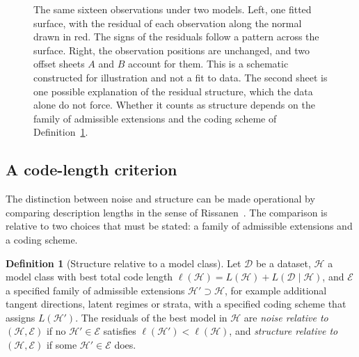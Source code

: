 \documentclass[11pt,a4paper]{article}
\theoremstyle{definition}
\newtheorem{definition}[theorem]{Definition}
\theoremstyle{remark}
\begin{document}
\begin{figure}[ht]
\begin{minipage}[c]{0.49\linewidth}
\end{minipage}
\caption{The same sixteen observations under two models. Left, one fitted
surface, with the residual of each observation along the normal drawn in red.
The signs of the residuals follow a pattern across the surface. Right, the
observation positions are unchanged, and two offset sheets $A$ and $B$ account
for them. This is a schematic constructed for illustration and not a
fit to data. The second sheet is one possible explanation of the residual
structure, which the data alone do not force. Whether it counts as structure
depends on the family of admissible extensions and the coding scheme of
Definition~\ref{def:structure}.}
\label{fig:resolves}
\end{figure}

\subsection{A code-length criterion}

The distinction between noise and structure can be made operational by
comparing description lengths in the sense of Rissanen~\cite{rissanen1978modeling}.
The comparison is relative to two choices that must be stated: a family of
admissible extensions and a coding scheme.

\begin{definition}[Structure relative to a model class]\label{def:structure}
Let $\mathcal{D}$ be a dataset, $\mathcal{H}$ a model class with best total
code length $\ell(\mathcal{H})=L(\mathcal{H})+L(\mathcal{D}\mid\mathcal{H})$,
and $\mathcal{E}$ a specified family of admissible extensions
$\mathcal{H}'\supset\mathcal{H}$, for example additional tangent directions,
latent regimes or strata, with a specified coding scheme that assigns
$L(\mathcal{H}')$. The residuals of the best model in $\mathcal{H}$ are
\emph{noise relative to $(\mathcal{H},\mathcal{E})$} if no
$\mathcal{H}'\in\mathcal{E}$ satisfies $\ell(\mathcal{H}')<\ell(\mathcal{H})$,
and \emph{structure relative to $(\mathcal{H},\mathcal{E})$} if some
$\mathcal{H}'\in\mathcal{E}$ does.
\end{definition}
\end{document}
